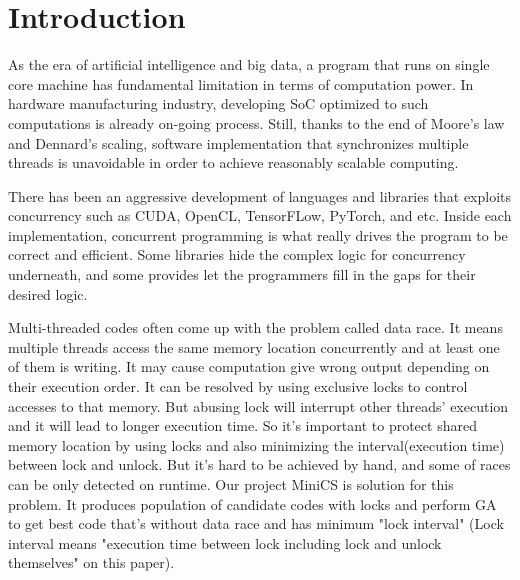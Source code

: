 \section{Introduction}

As the era of artificial intelligence and big data, a program that runs on single core machine has fundamental limitation in terms of computation power. In hardware manufacturing industry, developing SoC optimized to such computations is already on-going process. Still, thanks to the end of Moore's law and Dennard's scaling, software implementation that synchronizes multiple threads is unavoidable in order to achieve reasonably scalable computing.

There has been an aggressive development of languages and libraries that exploits concurrency such as CUDA, OpenCL, TensorFLow, PyTorch, and etc. Inside each implementation, concurrent programming is what really drives the program to be correct and efficient. Some libraries hide the complex logic for concurrency underneath, and some provides let the programmers fill in the gaps for their desired logic.

Multi-threaded codes often come up with the problem called data race. It means multiple threads access the same memory location concurrently and at least one of them is writing. It may cause computation give wrong output depending on their execution order. It can be resolved by using exclusive locks to control accesses to that memory. But abusing lock will interrupt other threads' execution and it will lead to longer execution time.
So it's important to protect shared memory location by using locks and also minimizing the interval(execution time) between lock and unlock. But it's hard to be achieved by hand, and some of races can be only detected on runtime.
Our project MiniCS is solution for this problem. It produces population of candidate codes with locks and perform GA to get best code that's without data race and has minimum "lock interval" (Lock interval means "execution time between lock including lock and unlock themselves" on this paper).